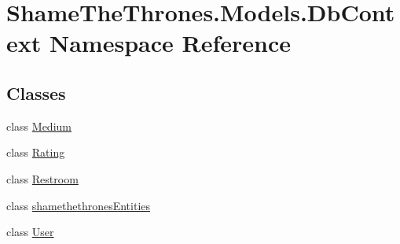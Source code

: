 \hypertarget{namespace_shame_the_thrones_1_1_models_1_1_db_context}{}\section{Shame\+The\+Thrones.\+Models.\+Db\+Context Namespace Reference}
\label{namespace_shame_the_thrones_1_1_models_1_1_db_context}
\subsection*{Classes}
\begin{DoxyCompactItemize}
\item 
class \hyperlink{class_shame_the_thrones_1_1_models_1_1_db_context_1_1_medium}{Medium}
\item 
class \hyperlink{class_shame_the_thrones_1_1_models_1_1_db_context_1_1_rating}{Rating}
\item 
class \hyperlink{class_shame_the_thrones_1_1_models_1_1_db_context_1_1_restroom}{Restroom}
\item 
class \hyperlink{class_shame_the_thrones_1_1_models_1_1_db_context_1_1shamethethrones_entities}{shamethethrones\+Entities}
\item 
class \hyperlink{class_shame_the_thrones_1_1_models_1_1_db_context_1_1_user}{User}
\end{DoxyCompactItemize}
